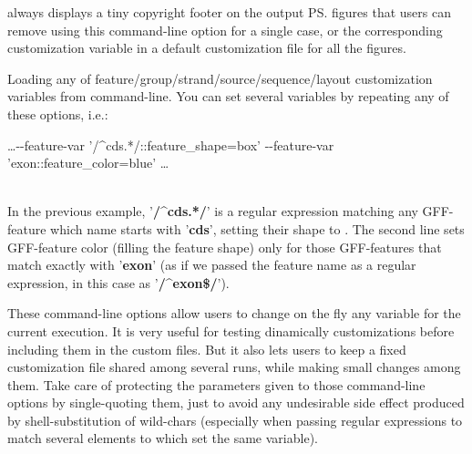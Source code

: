%
   { {\prog} always displays a tiny copyright footer on the output {\ps} figures that users can remove using this command-line option for a single case, or the corresponding customization variable in a default customization file for all the figures. }
%
%
%
%
%
%
   { Loading any of feature/group/strand/source/sequence/layout customization variables from command-line. You can set several variables by repeating any of these options, i.e.:\\[1.5ex] 
 \begin{minipage}{\linewidth} \begin{center} \sffamily\small \ldots -\/-feature-var '/\^{ }cds.*/::feature\_shape=box' -\/-feature-var 'exon::feature\_color=blue' \ldots \end{center} \end{minipage}\\[1.5ex] 
 In the previous example, '\textbf{\textsf{/\^{ }cds.*/}}' is a regular expression matching any GFF-feature which name starts with '\textbf{\textsf{cds}}', setting their shape to . The second line sets GFF-feature color (filling the feature shape) only for those GFF-features that match exactly with '\textbf{\textsf{exon}}' (as if we passed the feature name as a regular expression, in this case as '\textbf{\textsf{/\^{ }exon\$/}}'). 
 
 These command-line options allow users to change on the fly any variable for the current {\prog} execution. It is very useful for testing dinamically customizations before including them in the custom files. But it also lets users to keep a fixed customization file shared among several runs, while making small changes among them. Take care of protecting the parameters given to those command-line options by single-quoting them, just to avoid any undesirable side effect produced by shell-substitution of wild-chars (especially when passing regular expressions to match several elements to which set the same variable). }
